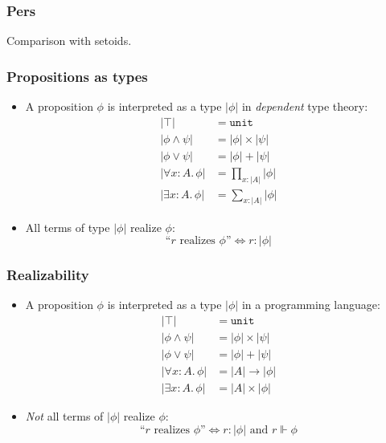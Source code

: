 \documentclass[t]{beamer}
\begin{document}
\begin{frame}
  \frametitle{Pers}

  Comparison with setoids.

\end{frame}

\begin{frame}
  \frametitle{Propositions as types}

  \begin{itemize}
  \item A proposition $\phi$ is interpreted as a type $|\phi|$ in
    \emph{dependent} type theory:
    \begin{align*}
      |\top| &= \mathtt{unit} \\
      |\phi \land \psi| &= |\phi| \times |\psi| \\
      |\phi \lor \psi| &= |\phi| + |\psi| \\
      |\forall x : A .\, \phi| &= \textstyle\prod_{x : |A|} |\phi| \\
      |\exists x : A .\, \phi| &= \textstyle\sum_{x : |A|} |\phi|
    \end{align*}
  \item All terms of type $|\phi|$ realize $\phi$:
    \begin{equation*}
      \text{``$r$ realizes $\phi$''} \iff r : |\phi|
    \end{equation*}
  \end{itemize}
\end{frame}

\begin{frame}
  \frametitle{Realizability}

  \begin{itemize}
  \item A proposition $\phi$ is interpreted as a type $|\phi|$ in a
    programming language:
    \begin{align*}
      |\top| &= \mathtt{unit} \\
      |\phi \land \psi| &= |\phi| \times |\psi| \\
      |\phi \lor \psi| &= |\phi| + |\psi| \\
      |\forall x : A .\, \phi| &= |A| \to |\phi| \\
      |\exists x : A .\, \phi| &= |A| \times |\phi|
    \end{align*}
  \item \emph{Not} all terms of $|\phi|$ realize $\phi$:
    \begin{equation*}
      \text{``$r$ realizes $\phi$''} \iff \text{$r : |\phi|$ and $r \Vdash \phi$}
    \end{equation*}
  \end{itemize}
\end{frame}
\end{document}
